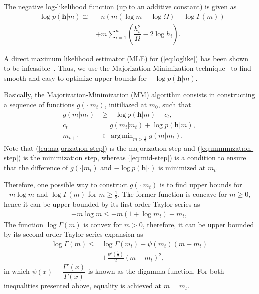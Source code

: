 \documentclass[conference, 10pt]{IEEEtran}
\DeclareMathOperator*{\argmin}{arg\,min}
\begin{document}
The negative log-likelihood function (up to an additive constant) is given as
\begin{align}
-\log p(\bm{h} | m) \cong &-n\left(m\left(\log m - \log\Omega\right) - \log\Gamma(m)\right)\nonumber
    \\ & +m\sum_{i=1}^{n}\left(\dfrac{h_i^2}{\Omega} - 2\log h_i\right).
    \label{eq:loglike}
\end{align}

A direct maximum likelihood estimator (MLE) for (\ref{eq:loglike}) has been
shown to be infeasible~\cite{cheng2001}. Thus, we use the
Majorization-Minimization technique~\cite{sun2016} to find smooth
and easy to optimize upper bounds for $-\log p(\bm{h}| m)$.

Basically, the Majorization-Minimization (MM) algorithm consists in constructing a
sequence of functions $g(\cdot | m_t)$, initiliazed at $m_0$, such that
\begin{align}
    g(m | m_t) &\geq -\log p(\bm{h}| m) + c_t\label{eq:majorization-step},\\
    c_t &= g(m_t | m_t) + \log p(\bm{h}| m)\label{eq:mid-step},\\
    m_{t+1} &\in \argmin_{m > \frac{1}{2}} g(m | m_t)\label{eq:minimization-step}.
\end{align}
Note that (\ref{eq:majorization-step}) is the majorization step and (\ref{eq:minimization-step})
is the minimization step, whereas (\ref{eq:mid-step}) is a condition to ensure that the difference
of $g(\cdot | m_t)$ and $-\log p(\bm{h}| \cdot)$ is minimized at $m_t$.

Therefore, one possible way to construct $g(\cdot|m_t)$ is to find upper bounds for
$-m\log m$ and $\log \Gamma(m)$ for $m \geq \frac{1}{2}$.
The former function is concave for $m \geq 0$, hence it can be upper bounded
by its first order Taylor series as
\begin{align}
    -m \log m \leq -m(1 + \log m_t) + m_t,
    \label{eq:upper-bound-mlogm}
\end{align}
The function $\log \Gamma(m)$ is convex for $m > 0$, therefore, it can be upper bounded
by its second order Taylor series expansion as
\begin{align}
    \log \Gamma(m) \leq&  \log \Gamma(m_t) + \psi(m_t) (m - m_t)\nonumber\\
                        &  + \frac{\psi'\left(\frac{1}{2}\right)}{2}(m - m_t) ^ 2,
    \label{eq:upper-bound-negloggamma}
\end{align}
in which $\psi(x) = \dfrac{\Gamma'(x)}{\Gamma(x)}$ is known as the digamma function.
For both inequalities presented above, equality is achieved at $m = m_t$.
\end{document}
